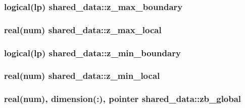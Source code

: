 \subsubsection[{\texorpdfstring{z\+\_\+max\+\_\+boundary}{z_max_boundary}}]{\setlength{\rightskip}{0pt plus 5cm}logical(lp) shared\+\_\+data\+::z\+\_\+max\+\_\+boundary}\hypertarget{namespaceshared__data_aa4005dc9afe16dc3fb569acf6236e135}{}\label{namespaceshared__data_aa4005dc9afe16dc3fb569acf6236e135}
\subsubsection[{\texorpdfstring{z\+\_\+max\+\_\+local}{z_max_local}}]{\setlength{\rightskip}{0pt plus 5cm}real(num) shared\+\_\+data\+::z\+\_\+max\+\_\+local}\hypertarget{namespaceshared__data_a7931e0059b790ccef3cc00c59d806c7c}{}\label{namespaceshared__data_a7931e0059b790ccef3cc00c59d806c7c}
\subsubsection[{\texorpdfstring{z\+\_\+min\+\_\+boundary}{z_min_boundary}}]{\setlength{\rightskip}{0pt plus 5cm}logical(lp) shared\+\_\+data\+::z\+\_\+min\+\_\+boundary}\hypertarget{namespaceshared__data_aa748805397529f7eca50f76b9beed0d5}{}\label{namespaceshared__data_aa748805397529f7eca50f76b9beed0d5}
\subsubsection[{\texorpdfstring{z\+\_\+min\+\_\+local}{z_min_local}}]{\setlength{\rightskip}{0pt plus 5cm}real(num) shared\+\_\+data\+::z\+\_\+min\+\_\+local}\hypertarget{namespaceshared__data_a1fb130b65ef2a707c1a79f91089e7dc0}{}\label{namespaceshared__data_a1fb130b65ef2a707c1a79f91089e7dc0}
\subsubsection[{\texorpdfstring{zb\+\_\+global}{zb_global}}]{\setlength{\rightskip}{0pt plus 5cm}real(num), dimension(\+:), pointer shared\+\_\+data\+::zb\+\_\+global}\hypertarget{namespaceshared__data_afd2142e5ba5165c1826ad1826cb061e3}{}\label{namespaceshared__data_afd2142e5ba5165c1826ad1826cb061e3}
